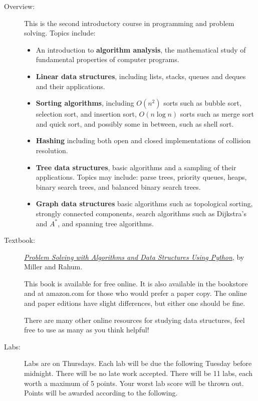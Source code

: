 \documentclass[12pt]{article}
\newcommand{\bi}{\begin{itemize}}
\newcommand{\li}{\item}
\newcommand{\ei}{\end{itemize}}
\begin{document}
\begin{description}
\item[Overview:]
This is the second introductory course in programming and problem
solving.  Topics include:
\bi
\li An introduction to {\bf algorithm analysis}, the mathematical study
of fundamental properties of computer programs.
\li {\bf Linear data structures}, including lists, stacks, queues and deques
and their applications.
\li {\bf Sorting algorithms}, including $O(n^2)$ sorts such as bubble sort,
selection sort, and insertion sort, $O(n\log n)$ sorts such as merge sort
and quick sort, and possibly some in between, such as shell sort.
\li {\bf Hashing} including both open and closed implementations
of collision resolution. 
\li {\bf Tree data structures}, basic algorithms and a sampling of their applications. 
Topics may include: parse trees, priority queues, heaps, binary search trees,
and balanced binary search trees.
\li {\bf Graph data structures} basic algorithms such as topological sorting,
strongly connected components, search algorithms such as Dijkstra's and $A^*$,
and spanning tree algorithms.
\ei

\item[Textbook:]
\href{https://runestone.academy/ns/books/published/pythonds/index.html}
{\em Problem Solving with Algorithms and Data Structures
Using Python}, by Miller and Rahum.

This book is available for free online.  
It is also available in the bookstore and at
amazon.com for those who would prefer a paper copy.
The online and paper editions have slight differences, but
either one should be fine.

There are many other online resources for studying
data structures, feel free to use as many as you think helpful!


\item[Labs:] Labs are on Thursdays.  Each lab will be due
the following Tuesday before midnight.  There will be no
late work accepted.   
There will be 11 labs, each worth a maximum of 5 points.  Your worst lab score will be 
thrown out.
Points will be awarded according to the
following.



\end{description}
\end{document}
